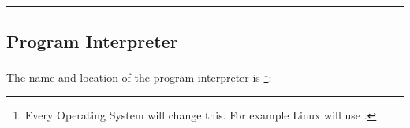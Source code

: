 \bigskip\hrule

\subsection{Program Interpreter}

The name and location of the program interpreter  is%
\footnote{Every Operating System will change this.
  For example Linux will use .}:

\bigskip
{}

